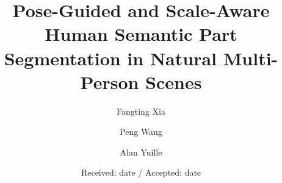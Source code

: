 \title{Pose-Guided and Scale-Aware Human Semantic Part Segmentation in Natural Multi-Person Scenes
}



\author{Fangting Xia         \and
        Peng Wang \and
        Alan Yuille %
}



\date{Received: date / Accepted: date}

\maketitle

